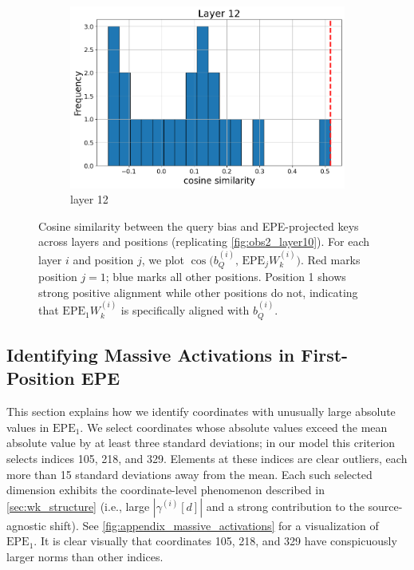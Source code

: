 \documentclass[11pt]{article}
\begin{document}
\begin{figure}[t]
\begin{subfigure}[t]{0.24\textwidth}
    \includegraphics[width=1.4\columnwidth]{figures/obs2_appendix/obs2_layer12.png}
    \caption{layer 12}
  \end{subfigure}\hfill
    \vspace{2mm}

  \caption{Cosine similarity between the query bias and EPE-projected keys across layers and positions (replicating \cref{fig:obs2_layer10}). For each layer $i$ and position $j$, we plot $\cos\big(b_Q^{(i)},\, \mathrm{EPE}_jW_k^{(i)}\big)$. Red marks position $j{=}1$; blue marks all other positions. Position 1 shows strong positive alignment while other positions do not, indicating that $\mathrm{EPE}_1W_k^{(i)}$ is specifically aligned with $b_Q^{(i)}$.}
  \label{fig:appendix_obs2_all_layers}
\end{figure}

\subsection{Identifying Massive Activations in First-Position EPE}\label{app:massive_activations_in_ppe}

This section explains how we identify coordinates with unusually large absolute values in $\mathrm{EPE}_1$. We select coordinates whose absolute values exceed the mean absolute value by at least three standard deviations; in our model this criterion selects indices 105, 218, and 329. Elements at these indices are clear outliers, each more than 15 standard deviations away from the mean. Each such selected dimension exhibits the coordinate-level phenomenon described in \cref{sec:wk_structure} (i.e., large $|\gamma^{(i)}[d]|$ and a strong contribution to the source-agnostic shift). See \cref{fig:appendix_massive_activations} for a visualization of $\mathrm{EPE}_1$. It is clear visually that coordinates 105, 218, and 329 have conspicuously larger norms than other indices. 
\end{document}
